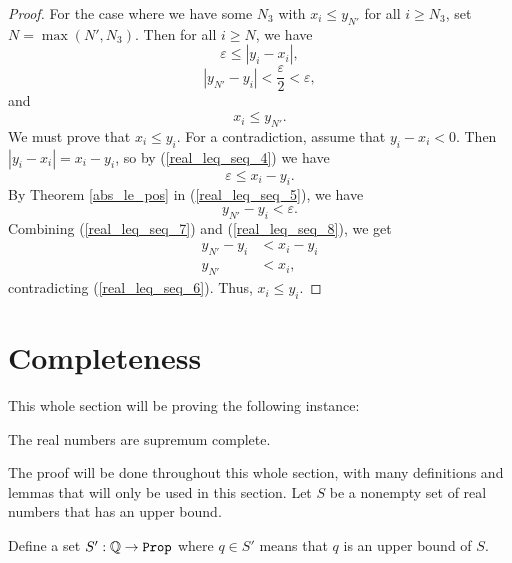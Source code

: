 \documentclass[../../math.tex]{subfiles}
\begin{document}
\begin{proof}
    For the case where we have some $N_3$ with $x_i \leq y_{N'}$ for all $i
    \geq N_3$, set $N = \max(N', N_3)$.  Then for all $i \geq N$, we have
    \begin{equation} \label{real_leq_seq_4}
        \varepsilon \leq |y_i - x_i|,
    \end{equation}
    \begin{equation} \label{real_leq_seq_5}
        |y_{N'} - y_i| < \frac{\varepsilon}{2} < \varepsilon,
    \end{equation}
    and
    \begin{equation} \label{real_leq_seq_6}
        x_i \leq y_{N'}.
    \end{equation}
    We must prove that $x_i \leq y_i$.  For a contradiction, assume that $y_i -
    x_i < 0$.  Then $|y_i - x_i| = x_i - y_i$, so by (\ref{real_leq_seq_4}) we
    have
    \begin{equation} \label{real_leq_seq_7}
        \varepsilon \leq x_i - y_i.
    \end{equation}
    By Theorem \ref{abs_le_pos} in (\ref{real_leq_seq_5}), we have
    \begin{equation} \label{real_leq_seq_8}
        y_{N'} - y_i < \varepsilon.
    \end{equation}
    Combining (\ref{real_leq_seq_7}) and (\ref{real_leq_seq_8}), we get
    \begin{align*}
        y_{N'} - y_i &< x_i - y_i \\
        y_{N'} &< x_i,
    \end{align*}
    contradicting (\ref{real_leq_seq_6}).  Thus, $x_i \leq y_i$.
\end{proof}

\section{Completeness}

This whole section will be proving the following instance:

\begin{instance}
    The real numbers are supremum complete.
\end{instance}

The proof will be done throughout this whole section, with many definitions and
lemmas that will only be used in this section.  Let $S$ be a nonempty set of
real numbers that has an upper bound.

\begin{definition}
    Define a set $S' : \Q \to \Prop$ where $q \in S'$ means that $q$ is an upper
    bound of $S$.
\end{definition}
\end{document}
